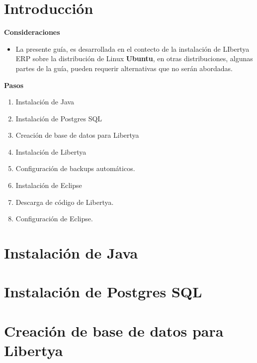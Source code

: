\documentclass[letterpaper,10pt,spanish]{sphinxmanual}
\begin{document}
\section{Introducción}
\label{tecnica:introduccion}
\textbf{Consideraciones}
\begin{itemize}
\item {} 
La presente guía, es desarrollada en el contecto de la instalación de LIbertya ERP sobre la distribución de Linux \textbf{Ubuntu}, en otras distribuciones, algunas partes de la guía, pueden requerir alternativas que no serán abordadas.

\end{itemize}

\textbf{Pasos}
\begin{enumerate}
\item {} 
Instalación de Java

\item {} 
Instalación de Postgres SQL

\item {} 
Creación de base de datos para Libertya

\item {} 
Instalación de Libertya

\item {} 
Configuración de backups automáticos.

\item {} 
Instalación de Eclipse

\item {} 
Descarga de código de Libertya.

\item {} 
Configuración de Eclipse.

\end{enumerate}


\section{Instalación de Java}
\label{tecnica:instalacion-de-java}

\section{Instalación de Postgres SQL}
\label{tecnica:instalacion-de-postgres-sql}

\section{Creación de base de datos para Libertya}
\label{tecnica:creacion-de-base-de-datos-para-libertya}
\end{document}
